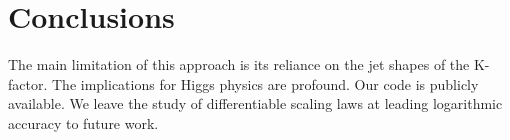 \section{Conclusions}\label{sec:conclusions}

The main limitation of this approach is its reliance on the jet shapes
of the K-factor. The implications for Higgs physics are profound. Our
code is publicly available. We leave the study of differentiable scaling
laws at leading logarithmic accuracy to future work.

